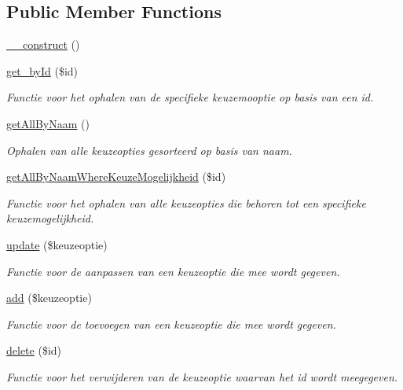 \subsection*{Public Member Functions}
\begin{DoxyCompactItemize}
\item 
\mbox{\hyperlink{class_keuzeoptie___model_a095c5d389db211932136b53f25f39685}{\+\_\+\+\_\+construct}} ()
\item 
\mbox{\hyperlink{class_keuzeoptie___model_a98d28a4d9a29d40c5a8aa0176f19a919}{get\+\_\+by\+Id}} (\$id)
\begin{DoxyCompactList}\small\item\em Functie voor het ophalen van de specifieke keuzemooptie op basis van een id. \end{DoxyCompactList}\item 
\mbox{\hyperlink{class_keuzeoptie___model_a2b035b1ffd1cbe651b35bb3e53d72c09}{get\+All\+By\+Naam}} ()
\begin{DoxyCompactList}\small\item\em Ophalen van alle keuzeopties gesorteerd op basis van naam. \end{DoxyCompactList}\item 
\mbox{\hyperlink{class_keuzeoptie___model_a6f3e4d26ab480501524eabb01683f5f7}{get\+All\+By\+Naam\+Where\+Keuze\+Mogelijkheid}} (\$id)
\begin{DoxyCompactList}\small\item\em Functie voor het ophalen van alle keuzeopties die behoren tot een specifieke keuzemogelijkheid. \end{DoxyCompactList}\item 
\mbox{\hyperlink{class_keuzeoptie___model_a9d98d1a6c3919a0e7b946d37fa385948}{update}} (\$keuzeoptie)
\begin{DoxyCompactList}\small\item\em Functie voor de aanpassen van een keuzeoptie die mee wordt gegeven. \end{DoxyCompactList}\item 
\mbox{\hyperlink{class_keuzeoptie___model_a2452f524e794bc3f418d60cb296e19b5}{add}} (\$keuzeoptie)
\begin{DoxyCompactList}\small\item\em Functie voor de toevoegen van een keuzeoptie die mee wordt gegeven. \end{DoxyCompactList}\item 
\mbox{\hyperlink{class_keuzeoptie___model_a2f8258add505482d7f00ea26493a5723}{delete}} (\$id)
\begin{DoxyCompactList}\small\item\em Functie voor het verwijderen van de keuzeoptie waarvan het id wordt meegegeven. \end{DoxyCompactList}\end{DoxyCompactItemize}



